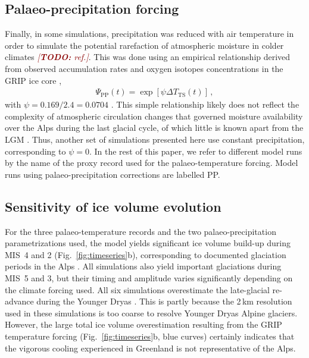 \documentclass[tc, manuscript]{copernicus}
\newcommand{\todo}[1]{\textcolor{darkred}{\emph{[\textbf{TODO:} #1]}}}
\begin{document}
\subsection{Palaeo-precipitation forcing}
\label{sec:palprec}

    Finally, in some simulations, precipitation was reduced with air temperature in
    order to simulate the potential rarefaction of atmospheric moisture in
    colder climates \todo{ref.}. This was done using an empirical relationship derived from
    observed accumulation rates and oxygen isotopes concentrations in the GRIP
    ice core \citep{Dahl-Jensen.etal.1993},
    \begin{align}
      {\Psi}_{\text{PP}}(t) = \exp[\psi{\Delta}T_{\text{TS}}(t)] \,,
    \end{align}
    with $\psi=0.169/2.4=0.0704$ \citep{Huybrechts.2002}. This simple
    relationship likely does not reflect the complexity of atmospheric
    circulation changes that governed moisture availability over the Alps
    during the last glacial cycle, of which little is known apart from the
    LGM \citep[cf.][]{Wu.etal.2007, Strandberg.etal.2011, Ludwig.etal.2016}.
    Thus, another set of simulations presented here use constant
    precipitation, corresponding to $\psi=0$. In the rest of this paper, we
    refer to different model runs by the name of the proxy record used for the
    palaeo-temperature forcing. Model runs using palaeo-precipitation
    corrections are labelled PP.


\subsection{Sensitivity of ice volume evolution}
\label{sec:timeseries}

    For the three palaeo-temperature records and the two palaeo-precipitation
    parametrizations used, the model yields significant ice volume build-up
    during MIS~4 and 2 (Fig.~\ref{fig:timeseries}b), corresponding to documented
    glaciation periods in the Alps \citep{Preusser.2004, Ivy-Ochs.etal.2008}.
    All simulations also yield important glaciations during MIS~5 and 3, but
    their timing and amplitude varies significantly depending on the climate
    forcing used. All six simulations overestimate the late-glacial re-advance
    during the Younger Dryas
    \citep[\todo{timing}, cf. e.g.,][]{Ivy-Ochs.etal.2009}.
    This is partly because the 2\,km resolution used in these simulations is
    too coarse to resolve
    Younger Dryas Alpine glaciers. However, the large total ice volume
    overestimation resulting from the GRIP temperature forcing
    (Fig.~\ref{fig:timeseries}b, blue curves) certainly indicates that the
    vigorous cooling experienced in Greenland is not representative of the
    Alps.
\end{document}
